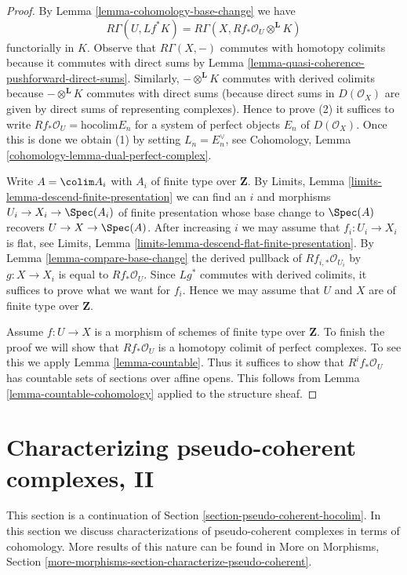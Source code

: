 \begin{proof}
By Lemma \ref{lemma-cohomology-base-change} we have
$$
R\Gamma(U, Lf^*K) = R\Gamma(X, Rf_*\mathcal{O}_U \otimes^\mathbf{L} K)
$$
functorially in $K$. Observe that $R\Gamma(X, -)$ commutes with
homotopy colimits because it commutes with direct sums by
Lemma \ref{lemma-quasi-coherence-pushforward-direct-sums}.
Similarly, $- \otimes^\mathbf{L} K$ commutes with derived colimits
because $- \otimes^\mathbf{L} K$ commutes with direct sums
(because direct sums in $D(\mathcal{O}_X)$
are given by direct sums of representing complexes).
Hence to prove (2) it suffices to write
$Rf_*\mathcal{O}_U = \text{hocolim} E_n$ for a system of
perfect objects $E_n$ of $D(\mathcal{O}_X)$. Once this is done
we obtain (1) by setting $L_n = E_n^\vee$, see
Cohomology, Lemma \ref{cohomology-lemma-dual-perfect-complex}.

\medskip\noindent
Write $A = \colim A_i$ with $A_i$ of finite type over $\mathbf{Z}$.
By Limits, Lemma \ref{limits-lemma-descend-finite-presentation}
we can find an $i$ and morphisms $U_i \to X_i \to \Spec(A_i)$
of finite presentation whose base change to $\Spec(A)$ recovers
$U \to X \to \Spec(A)$.
After increasing $i$ we may assume that $f_i : U_i \to X_i$ is
flat, see Limits, Lemma \ref{limits-lemma-descend-flat-finite-presentation}.
By Lemma \ref{lemma-compare-base-change}
the derived pullback of $Rf_{i, *}\mathcal{O}_{U_i}$
by $g : X \to X_i$ is equal to $Rf_*\mathcal{O}_U$.
Since $Lg^*$ commutes with derived colimits, it suffices
to prove what we want for $f_i$. Hence we may assume that
$U$ and $X$ are of finite type over $\mathbf{Z}$.

\medskip\noindent
Assume $f : U \to X$ is a morphism of schemes of finite type over $\mathbf{Z}$.
To finish the proof we will show that $Rf_*\mathcal{O}_U$ is a homotopy
colimit of perfect complexes. To see this we apply Lemma \ref{lemma-countable}.
Thus it suffices to show that $R^if_*\mathcal{O}_U$
has countable sets of sections over affine opens.
This follows from Lemma \ref{lemma-countable-cohomology}
applied to the structure sheaf.
\end{proof}




\section{Characterizing pseudo-coherent complexes, II}
\label{section-pseudo-coherent}

\noindent
This section is a continuation of
Section \ref{section-pseudo-coherent-hocolim}.
In this section we discuss characterizations of pseudo-coherent complexes
in terms of cohomology. More results of this nature can be found in
More on Morphisms, Section
\ref{more-morphisms-section-characterize-pseudo-coherent}.

